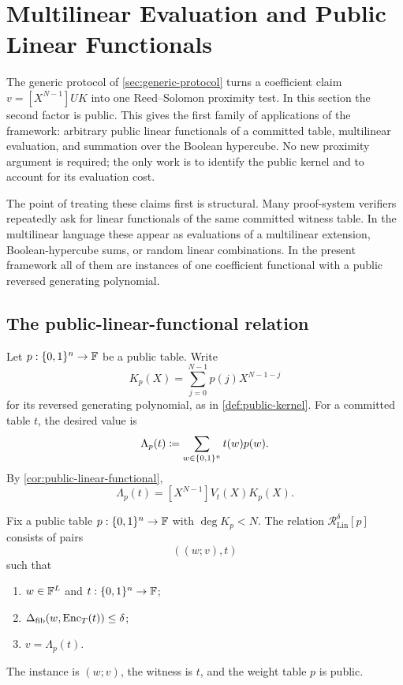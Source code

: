 \section{Multilinear Evaluation and Public Linear Functionals}
\label{sec:linear-functionals}

The generic protocol of \cref{sec:generic-protocol} turns a coefficient claim
\(
  v=[X^{N-1}]UK
\)
into one Reed--Solomon proximity test.  In this section the second factor is public.  This gives the first family of applications of the framework: arbitrary public linear functionals of a committed table, multilinear evaluation, and summation over the Boolean hypercube.  No new proximity argument is required; the only work is to identify the public kernel and to account for its evaluation cost.

The point of treating these claims first is structural.  Many proof-system verifiers repeatedly ask for linear functionals of the same committed witness table.  In the multilinear language these appear as evaluations of a multilinear extension, Boolean-hypercube sums, or random linear combinations.  In the present framework all of them are instances of one coefficient functional with a public reversed generating polynomial.

\subsection{The public-linear-functional relation}
\label{sec:public-linear-functional-relation}

Let \(p:\{0,1\}^n\to\mathbb{F}\) be a public table.  Write
\[
  K_p(X)
  =\sum_{j=0}^{N-1}p(j)X^{N-1-j}
\]
for its reversed generating polynomial, as in \cref{def:public-kernel}.  For a committed table \(t\), the desired value is
\[
  \Lambda_p(t)
  \coloneqq
  \sum_{w\in\{0,1\}^n} t(w)p(w).
\]
By \cref{cor:public-linear-functional},
\begin{equation}
  \Lambda_p(t)
  = [X^{N-1}]V_t(X)K_p(X).
  \label{eq:linear-functional-coefficient}
\end{equation}

\begin{definition}
\label{def:public-linear-functional-relation}
Fix a public table \(p:\{0,1\}^n\to\mathbb{F}\) with \(\deg K_p<N\).  The relation \(\mathcal R^{\delta}_{\mathrm{Lin}}[p]\) consists of pairs
\[
  ((w;v),t)
\]
such that
\begin{enumerate}[label=(\roman*),leftmargin=*]
  \item \(w\in\mathbb{F}^L\) and \(t:\{0,1\}^n\to\mathbb{F}\);
  \item \(\Delta_{\mathrm{fib}}(w,\operatorname{Enc}_T(t))\le\delta\);
  \item \(v=\Lambda_p(t)\).
\end{enumerate}
The instance is \((w;v)\), the witness is \(t\), and the weight table \(p\) is public.
\end{definition}

